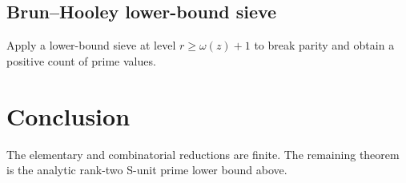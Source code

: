 \documentclass[11pt]{article}
\begin{document}
\subsection{Brun--Hooley lower-bound sieve}
Apply a lower-bound sieve at level \(r\ge \omega(z)+1\) to break parity and
obtain a positive count of prime values.

\section{Conclusion}
The elementary and combinatorial reductions are finite.  The remaining theorem
is the analytic rank-two S-unit prime lower bound above.
\end{document}
